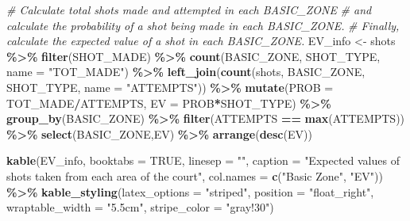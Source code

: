 \documentclass[
  12pt,
  a4paper,
]{article}
\newenvironment{Shaded}{\begin{snugshade}}{\end{snugshade}}
\newcommand{\AttributeTok}[1]{\textcolor[rgb]{0.13,0.29,0.53}{#1}}
\newcommand{\CommentTok}[1]{\textcolor[rgb]{0.56,0.35,0.01}{\textit{#1}}}
\newcommand{\ConstantTok}[1]{\textcolor[rgb]{0.56,0.35,0.01}{#1}}
\newcommand{\FunctionTok}[1]{\textcolor[rgb]{0.13,0.29,0.53}{\textbf{#1}}}
\newcommand{\NormalTok}[1]{#1}
\newcommand{\OtherTok}[1]{\textcolor[rgb]{0.56,0.35,0.01}{#1}}
\newcommand{\SpecialCharTok}[1]{\textcolor[rgb]{0.81,0.36,0.00}{\textbf{#1}}}
\newcommand{\StringTok}[1]{\textcolor[rgb]{0.31,0.60,0.02}{#1}}
\begin{document}
\begin{Shaded}
\begin{Highlighting}[]
\CommentTok{\# Calculate total shots made and attempted in each BASIC\_ZONE}
\CommentTok{\# and calculate the probability of a shot being made in each BASIC\_ZONE.}
\CommentTok{\# Finally, calculate the expected value of a shot in each BASIC\_ZONE.}
\NormalTok{EV\_info }\OtherTok{\textless{}{-}}\NormalTok{ shots }\SpecialCharTok{\%\textgreater{}\%}
  \FunctionTok{filter}\NormalTok{(SHOT\_MADE) }\SpecialCharTok{\%\textgreater{}\%}
  \FunctionTok{count}\NormalTok{(BASIC\_ZONE, SHOT\_TYPE, }\AttributeTok{name =} \StringTok{"TOT\_MADE"}\NormalTok{) }\SpecialCharTok{\%\textgreater{}\%}
  \FunctionTok{left\_join}\NormalTok{(}\FunctionTok{count}\NormalTok{(shots, BASIC\_ZONE, SHOT\_TYPE, }\AttributeTok{name =} \StringTok{"ATTEMPTS"}\NormalTok{)) }\SpecialCharTok{\%\textgreater{}\%}
  \FunctionTok{mutate}\NormalTok{(}\AttributeTok{PROB =}\NormalTok{ TOT\_MADE}\SpecialCharTok{/}\NormalTok{ATTEMPTS, }\AttributeTok{EV =}\NormalTok{ PROB}\SpecialCharTok{*}\NormalTok{SHOT\_TYPE) }\SpecialCharTok{\%\textgreater{}\%}
  \FunctionTok{group\_by}\NormalTok{(BASIC\_ZONE) }\SpecialCharTok{\%\textgreater{}\%}
  \FunctionTok{filter}\NormalTok{(ATTEMPTS }\SpecialCharTok{==} \FunctionTok{max}\NormalTok{(ATTEMPTS)) }\SpecialCharTok{\%\textgreater{}\%}
  \FunctionTok{select}\NormalTok{(BASIC\_ZONE,EV) }\SpecialCharTok{\%\textgreater{}\%}
  \FunctionTok{arrange}\NormalTok{(}\FunctionTok{desc}\NormalTok{(EV))}

\FunctionTok{kable}\NormalTok{(EV\_info, }\AttributeTok{booktabs =} \ConstantTok{TRUE}\NormalTok{, }\AttributeTok{linesep =} \StringTok{""}\NormalTok{,}
      \AttributeTok{caption =} \StringTok{"Expected values of shots}
\StringTok{                 taken from each area of the court"}\NormalTok{,}
      \AttributeTok{col.names =} \FunctionTok{c}\NormalTok{(}\StringTok{"Basic Zone"}\NormalTok{,}
                    \StringTok{"EV"}\NormalTok{)) }\SpecialCharTok{\%\textgreater{}\%}
  \FunctionTok{kable\_styling}\NormalTok{(}\AttributeTok{latex\_options =} \StringTok{"striped"}\NormalTok{,}
                \AttributeTok{position =} \StringTok{"float\_right"}\NormalTok{,}
                \AttributeTok{wraptable\_width =} \StringTok{"5.5cm"}\NormalTok{,}
                \AttributeTok{stripe\_color =} \StringTok{"gray!30"}\NormalTok{)}


\end{Highlighting}
\end{Shaded}
\end{document}
